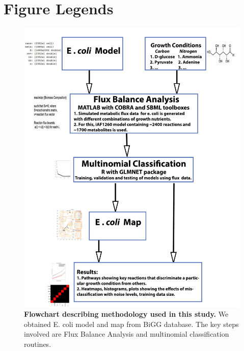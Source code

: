\documentclass[12pt]{article}
\begin{document}
\bigskip
\section*{Figure Legends}
\begin{figure}[!ht]
\begin{center}
\includegraphics[width=4.5in]{Figures/flowchart_new.pdf}
\end{center}
\caption{
{\bf Flowchart describing methodology used in this study.} We obtained E. coli model and map from BiGG database. The key steps involved are Flux Balance Analysis and multinomial classification routines.
}
\label{Figure_label}
\end{figure}
\end{document}
